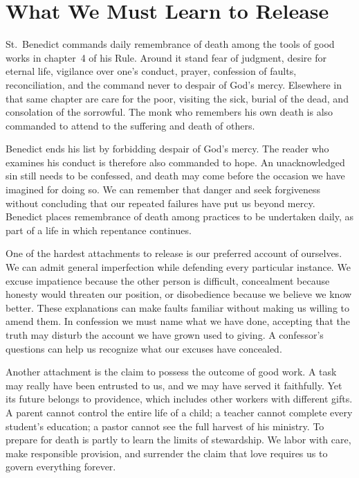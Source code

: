 \section{What We Must Learn to Release}

St.~Benedict commands daily remembrance of death among the tools of good works in chapter~4 of his Rule. Around it stand fear of judgment, desire for eternal life, vigilance over one's conduct, prayer, confession of faults, reconciliation, and the command never to despair of God's mercy. Elsewhere in that same chapter are care for the poor, visiting the sick, burial of the dead, and consolation of the sorrowful. The monk who remembers his own death is also commanded to attend to the suffering and death of others.

Benedict ends his list by forbidding despair of God's mercy. The reader who examines his conduct is therefore also commanded to hope. An unacknowledged sin still needs to be confessed, and death may come before the occasion we have imagined for doing so. We can remember that danger and seek forgiveness without concluding that our repeated failures have put us beyond mercy. Benedict places remembrance of death among practices to be undertaken daily, as part of a life in which repentance continues.

One of the hardest attachments to release is our preferred account of ourselves. We can admit general imperfection while defending every particular instance. We excuse impatience because the other person is difficult, concealment because honesty would threaten our position, or disobedience because we believe we know better. These explanations can make faults familiar without making us willing to amend them. In confession we must name what we have done, accepting that the truth may disturb the account we have grown used to giving. A confessor's questions can help us recognize what our excuses have concealed.

Another attachment is the claim to possess the outcome of good work. A task may really have been entrusted to us, and we may have served it faithfully. Yet its future belongs to providence, which includes other workers with different gifts. A parent cannot control the entire life of a child; a teacher cannot complete every student's education; a pastor cannot see the full harvest of his ministry. To prepare for death is partly to learn the limits of stewardship. We labor with care, make responsible provision, and surrender the claim that love requires us to govern everything forever.

